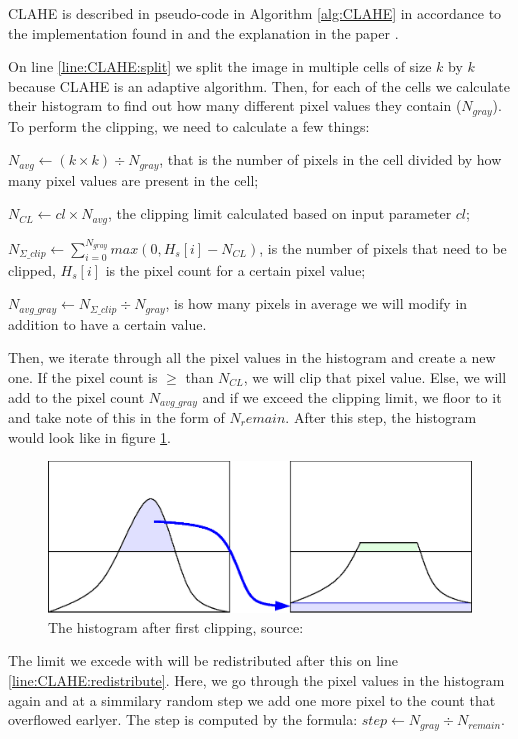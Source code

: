 CLAHE is described in pseudo-code in Algorithm \ref{alg:CLAHE} in accordance to the implementation found in \cite{site:CLAHE_code} and the explanation in the paper \cite{article:CLAHE_explanation}.

On line \ref{line:CLAHE:split} we split the image in multiple cells of size $k$ by $k$ because CLAHE is an adaptive algorithm.
Then, for each of the cells we calculate their histogram to find out how many different pixel values they contain ($N_{gray}$). To perform the clipping, we need to calculate a few things:

$N_{avg} \gets (k \times k) \div N_{gray}$, that is the number of pixels in the cell divided by how many pixel values are present in the cell;

$N_{CL} \gets cl \times N_{avg}$, the clipping limit calculated based on input parameter $cl$;

$N_{\Sigma\_clip} \gets \sum_{i=0}^{N_{gray}} max(0, H_s[i] - N_{CL})$, is the number of pixels that need to be clipped, $H_s[i]$ is the pixel count for a certain pixel value;

$N_{avg\_gray} \gets N_{\Sigma\_clip} \div N_{gray}$, is how many pixels in average we will modify in addition to have a certain value.

Then, we iterate through all the pixel values in the histogram and create a new one. If the pixel count is $\geq$ than $N_{CL}$, we will clip that pixel value. Else, we will add to the pixel count $N_{avg\_gray}$ and if we exceed the clipping limit, we floor to it and take note of this in the form of $N_remain$. After this step, the histogram would look like in figure \ref{fig:CLAHE_hist}.

\begin{figure}
    \centering
    \includegraphics[width=0.4\columnwidth]{img/algos/Clahe-redistribution.eps}
    \caption{The histogram after first clipping, source: \cite{site:CLAHE_clipping_image}}
    \label{fig:CLAHE_hist}
\end{figure}

The limit we excede with will be redistributed after this on line \ref{line:CLAHE:redistribute}. Here, we go through the pixel values in the histogram again and at a simmilary random step we add one more pixel to the count that overflowed earlyer. The step is computed by the formula: $step \gets N_{gray} \div N_{remain}$.


